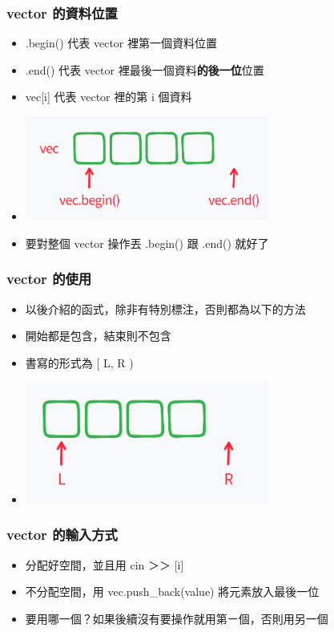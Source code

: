 \documentclass[mathserif]{beamer}
\begin{document}
\begin{frame}
    \frametitle{vector 的資料位置}
    \begin{itemize}
        \item .begin() 代表 vector 裡第一個資料位置
        \item .end() 代表 vector 裡最後一個資料\textbf{的後一位}位置
        \item vec[i] 代表 vector 裡的第 i 個資料
        \item<2-> \includegraphics[width=8.0cm]{img/3-1.png}
        \item<2-> 要對整個 vector 操作丟 .begin() 跟 .end() 就好了
    \end{itemize}
\end{frame}

\begin{frame}
    \frametitle{vector 的使用}
    \begin{itemize}
        \item 以後介紹的函式，除非有特別標注，否則都為以下的方法
        \item 開始都是包含，結束則不包含
        \item 書寫的形式為 [ L, R )
        \item \includegraphics[width=8.0cm]{img/3-2.png}
    \end{itemize}
\end{frame}

\begin{frame}
    \frametitle{vector 的輸入方式}
    \begin{itemize}
        \item 分配好空間，並且用 cin ＞＞ [i]
        \item 不分配空間，用 vec.push\_back({\color[rgb]{1,0,0}value}) 將元素放入最後一位
        \vspace{0.5cm}
        \item 要用哪一個？如果後續沒有要操作就用第ㄧ個，否則用另一個
    \end{itemize}
\end{frame}
\end{document}
